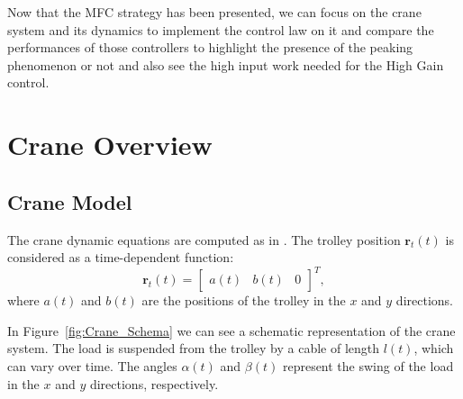 Now that the MFC strategy has been presented, we can focus on the crane system and its dynamics to
implement the control law on it and compare the performances of those controllers to highlight the presence 
of the peaking phenomenon or not and also see the high input work needed for the High Gain control.


\newpage

\section{Crane Overview}
\subsection{Crane Model}
The crane dynamic equations are computed as in \cite{Knierim2010Crane}. The trolley position \(\boldsymbol{r}_{t}(t)\) is considered as a time-dependent function:
\begin{equation}
    \textbf{r}_t(t) = \begin{bmatrix}
        a(t) & b(t) & 0
    \end{bmatrix}^T,
\end{equation}
where \(a(t)\) and \(b(t)\) are the positions of the trolley in the \(x\) and \(y\) directions.

In Figure~\ref{fig:Crane_Schema} we can see a schematic representation of the crane system. The load is suspended 
from the trolley by a cable of length \(l(t)\), which can vary over time. The angles \(\alpha(t)\) and 
\(\beta(t)\) represent the swing of the load in the \(x\) and \(y\) directions, respectively.

